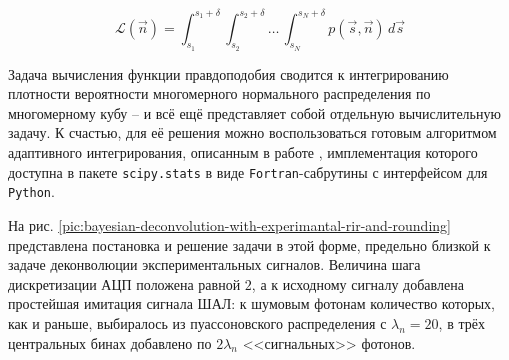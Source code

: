 \documentclass[12pt]{book}
\begin{document}
	\begin{equation}
		\label{eq:likelihood-with-error-uniform-error}
		\mathcal{L}(\vec{n}) = \int_{s_1}^{s_1 + \delta} \int_{s_2}^{s_2 + \delta} \ldots \, \int_{s_{N}}^{s_N + \delta} p(\vec{s}, \vec{n}) \, d\vec{s}
	\end{equation}

	Задача вычисления функции правдоподобия сводится к интегрированию плотности вероятности многомерного нормального распределения по многомерному кубу -- и всё ещё представляет собой отдельную вычислительную задачу. К счастью, для её решения можно воспользоваться готовым алгоритмом адаптивного интегрирования, описанным в работе \cite{Genz1992}, имплементация которого доступна в пакете \verb|scipy.stats| \cite{2020SciPy-NMeth} в виде \verb|Fortran|-сабрутины с интерфейсом для \verb|Python|.

	На рис. \ref{pic:bayesian-deconvolution-with-experimantal-rir-and-rounding} представлена постановка и решение задачи в этой форме, предельно близкой к задаче деконволюции экспериментальных сигналов. Величина шага дискретизации АЦП положена равной $2$, а к исходному сигналу добавлена простейшая имитация сигнала ШАЛ: к шумовым фотонам количество которых, как и раньше, выбиралось из пуассоновского распределения с $\lambda_n = 20$, в трёх центральных бинах добавлено по $2\lambda_n$ <<сигнальных>> фотонов.
\end{document}
